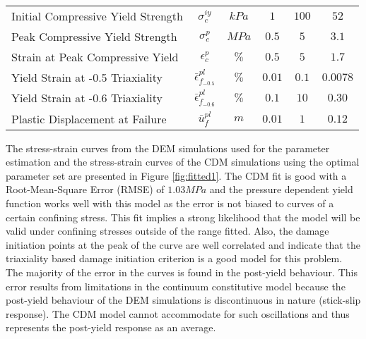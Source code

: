 \begin{table}[!htbp]
\begin{tabular}{@{}lccccc@{}}
Initial Compressive Yield Strength     & $\sigma_c^{iy}$                  & $kPa$          & $1$                                                             & $100$                                                           & $52$                                                              \\
Peak Compressive Yield Strength        & $\sigma_c^{p}$                   & $MPa$          & $0.5$                                                           & $5$                                                             & $3.1$                                                             \\
Strain at Peak Compressive Yield       & $\epsilon_c^{p}$                 & $\%$           & $0.5$                                                           & $5$                                                             & $1.7$                                                             \\
Yield Strain at -0.5 Triaxiality       & $\bar{\epsilon}^{pl}_{f_{-0.5}}$ & $\%$           & $0.01$                                                          & $0.1$                                                           & $0.0078$                                                          \\
Yield Strain at -0.6 Triaxiality       & $\bar{\epsilon}^{pl}_{f_{-0.6}}$ & $\%$           & $0.1$                                                           & $10$                                                            & $0.30$                                                            \\
Plastic Displacement at Failure        & $\bar{u}^{pl}_f$                 & $m$            & $0.01$                                                          & $1$                                                             & $0.12$                                                            \\ \bottomrule
\end{tabular}
\end{table}

The stress-strain curves from the DEM simulations used for the parameter estimation and the stress-strain curves of the CDM simulations using the optimal parameter set are presented in Figure \ref{fig:fitted1}. The CDM fit is good with a Root-Mean-Square Error (RMSE) of $1.03MPa$ and the pressure dependent yield function works well with this model as the error is not biased to curves of a certain confining stress. This fit implies a strong likelihood that the model will be valid under confining stresses outside of the range fitted. Also, the damage initiation points at the peak of the curve are well correlated and indicate that the triaxiality based damage initiation criterion is a good model for this problem. The majority of the error in the curves is found in the post-yield behaviour. This error results from limitations in the continuum constitutive model because the post-yield behaviour of the DEM simulations is discontinuous in nature (stick-slip response). The CDM model cannot accommodate for such oscillations and thus represents the post-yield response as an average. 
